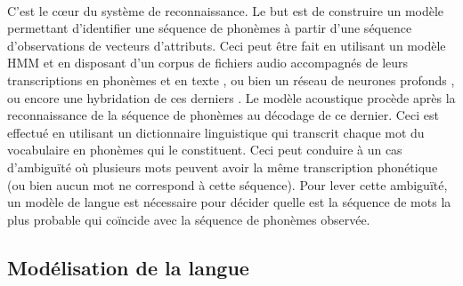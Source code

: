 \paragraph{}
C'est le c\oe{}ur du système de reconnaissance. Le but est de construire un modèle permettant d'identifier une séquence de phonèmes à partir d'une séquence d'observations de vecteurs d'attributs. Ceci peut être fait en utilisant un modèle HMM et en disposant d'un corpus de fichiers audio accompagnés de leurs transcriptions en phonèmes et en texte \citep{hmm_acoustic_model,hmm_formal}, ou bien un réseau de neurones profonds \citep{speech_reco_Yu2015}, ou encore une hybridation de ces derniers \citep{dnn-hmm_acoustic_model}. Le modèle acoustique procède après la reconnaissance de la séquence de phonèmes au décodage de ce dernier. Ceci est effectué en utilisant un dictionnaire linguistique qui transcrit chaque mot du vocabulaire en phonèmes qui le constituent. Ceci peut conduire à un cas d'ambiguïté où plusieurs mots peuvent avoir la même transcription phonétique (ou bien aucun mot ne correspond à cette séquence). Pour lever cette ambiguïté, un modèle de langue est nécessaire pour décider quelle est la séquence de mots la plus probable qui coïncide avec la séquence de phonèmes observée.  
\subsection{Modélisation de la langue}
